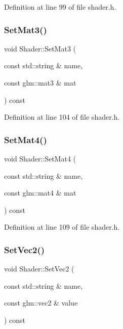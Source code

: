 Definition at line 99 of file shader.\+h.

\mbox{\label{class_shader_a2e0ffe4d09505df823e90469c630a411}} 
\subsubsection{\texorpdfstring{SetMat3()}{SetMat3()}}
{\footnotesize\ttfamily void Shader\+::\+Set\+Mat3 (\begin{DoxyParamCaption}\item[{const std\+::string \&}]{name,  }\item[{const glm\+::mat3 \&}]{mat }\end{DoxyParamCaption}) const\hspace{0.3cm}{\ttfamily [inline]}}



Definition at line 104 of file shader.\+h.

\mbox{\label{class_shader_a073aaba20478e601d18d761ef187d9aa}} 
\subsubsection{\texorpdfstring{SetMat4()}{SetMat4()}}
{\footnotesize\ttfamily void Shader\+::\+Set\+Mat4 (\begin{DoxyParamCaption}\item[{const std\+::string \&}]{name,  }\item[{const glm\+::mat4 \&}]{mat }\end{DoxyParamCaption}) const\hspace{0.3cm}{\ttfamily [inline]}}



Definition at line 109 of file shader.\+h.

\mbox{\label{class_shader_a80a8159b305cc1d89170c777fad8f027}} 
\subsubsection{\texorpdfstring{SetVec2()}{SetVec2()}\hspace{0.1cm}{\footnotesize\ttfamily [1/2]}}
{\footnotesize\ttfamily void Shader\+::\+Set\+Vec2 (\begin{DoxyParamCaption}\item[{const std\+::string \&}]{name,  }\item[{const glm\+::vec2 \&}]{value }\end{DoxyParamCaption}) const\hspace{0.3cm}{\ttfamily [inline]}}



